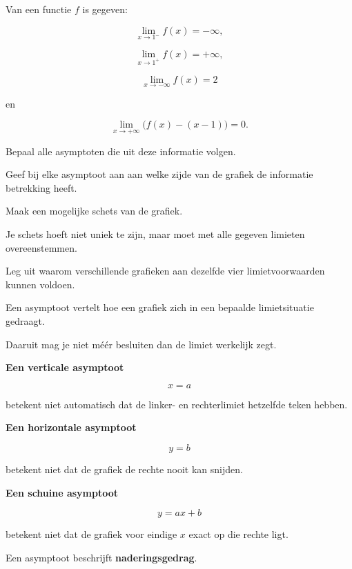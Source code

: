 \documentclass{ximera}
\begin{document}
\begin{oefening}{\oefU\ESS}

Van een functie $f$ is gegeven:

\[
\lim_{x\to1^-}f(x)=-\infty,
\]

\[
\lim_{x\to1^+}f(x)=+\infty,
\]

\[
\lim_{x\to-\infty}f(x)=2
\]

en

\[
\lim_{x\to+\infty}
\bigl(f(x)-(x-1)\bigr)=0.
\]

\begin{question}
Bepaal alle asymptoten die uit deze informatie volgen.
\end{question}

\begin{question}
Geef bij elke asymptoot aan aan welke zijde van de grafiek de
informatie betrekking heeft.
\end{question}

\begin{question}
Maak een mogelijke schets van de grafiek.

Je schets hoeft niet uniek te zijn, maar moet met alle gegeven
limieten overeenstemmen.
\end{question}

\begin{question}
Leg uit waarom verschillende grafieken aan dezelfde vier
limietvoorwaarden kunnen voldoen.
\end{question}

\end{oefening}




Een asymptoot vertelt hoe een grafiek zich in een bepaalde
limietsituatie gedraagt.

Daaruit mag je niet méér besluiten dan de limiet werkelijk zegt.

\begin{opmerking}

\textbf{Een verticale asymptoot}

\[
x=a
\]

betekent niet automatisch dat de linker- en rechterlimiet hetzelfde
teken hebben.

\medskip

\textbf{Een horizontale asymptoot}

\[
y=b
\]

betekent niet dat de grafiek de rechte nooit kan snijden.

\medskip

\textbf{Een schuine asymptoot}

\[
y=ax+b
\]

betekent niet dat de grafiek voor eindige $x$ exact op die rechte
ligt.

\medskip

Een asymptoot beschrijft \textbf{naderingsgedrag}.

\end{opmerking}
\end{document}
